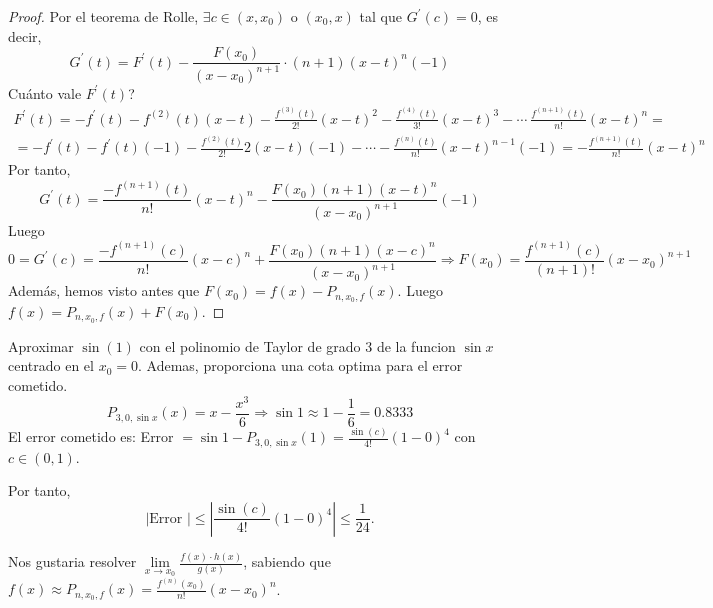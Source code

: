 \begin{proof}
	Por el teorema de Rolle, \(\exists c \in (x, x_0 )\) o \((x_0, x )\) tal que \(G^\prime (c) = 0 \), es decir,
	\[
		G^\prime (t) = F^\prime (t) - \frac{F(x_0 )}{(x - x_0)^{n + 1} } \cdot (n + 1) (x - t)^{n} (-1)
	\]
	Cuánto vale \(F^\prime (t )\)?
	\begin{multline*}
		F^\prime (t) = - f^\prime (t) - f^{(2)}  (t)(x - t) - \frac{f^{(3)} (t) }{2!}(x - t)^{2} - \frac{f^{(4)}(t)}{3!} (x - t)^{3} - \cdots \ \frac{f^{(n + 1)}(t) }{n!} (x - t)^{n} = \\ = -f^\prime (t) - f^\prime (t)(-1) - \frac{f^{(2)}(t) }{2!} 2 (x - t)(-1) - \cdots - \frac{f^{(n)} (t)}{n!}(x - t)^{n - 1}(-1) = - \frac{f^{(n + 1)} (t) }{n!}(x - t)^{n}
	\end{multline*}
	Por tanto,
	\[
		G^\prime (t) = \frac{-f^{(n + 1)}(t) }{n!}(x - t)^{n} - \frac{F(x_0)(n + 1)(x - t)^{n} }{(x - x_0)^{n + 1}}(-1)
	\]
	Luego
	\[
		0 = G^\prime (c) = \frac{-f^{(n+1)}(c) }{n!}(x - c)^{n} + \frac{F(x_0)(n + 1)(x - c)^{n} }{(x - x_0)^{n + 1} } \Rightarrow F(x_0) = \frac{f^{(n + 1)}(c) }{(n+1)!}(x -x_0)^{n + 1}
	\]
	Además, hemos visto antes que \(F(x_0) = f(x) - P_{n,x_0,f}(x )\). Luego \(f(x) = P_{n,x_0, f}(x) + F(x_0 )\).
\end{proof}

\begin{example}
	Aproximar \(\sin (1 )\) con el polinomio de Taylor de grado \(3 \) de la funcion \(\sin x \) centrado en el \(x_0 = 0 \). Ademas, proporciona una cota optima para el error cometido.
	\[
		P_{3,0,\sin x}(x) = x - \frac{x^{3} }{6} \Rightarrow \sin 1 \approx 1 - \frac{1}{6} = 0.8333
	\]
	El error cometido es: Error \(= \sin 1 - P_{3,0,\sin x}(1) = \frac{\sin (c)}{4!}(1 - 0)^{4}  \) con \(c \in (0,1 )\).

	Por tanto,
	\[
		\left\vert \text{Error }  \right\vert \leq \left\vert \frac{\sin (c)}{4!} (1 - 0)^{4}  \right\vert \leq \frac{1}{24}.
	\]
\end{example}

Nos gustaria resolver \(\lim\limits_{x  \to x_0 } \frac{f(x) \cdot h(x )}{g(x )}\), sabiendo que \(f(x) \approx P_{n,x_0,f}(x) = \frac{f^{(n)}(x_0) }{n!} (x - x_0)^{n} \).

